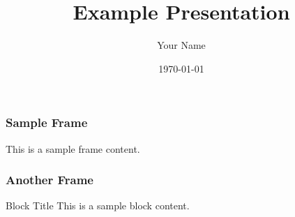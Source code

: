 \documentclass{beamer}
\begin{document}
\begin{frame}
    \title{Example Presentation}
    \author{Your Name}
    \date{\today}
    \maketitle
\end{frame}

\begin{frame}
    \frametitle{Sample Frame}
    This is a sample frame content.
\end{frame}

\begin{frame}
    \frametitle{Another Frame}
    \begin{block}{Block Title}
        This is a sample block content.
    \end{block}
\end{frame}
\end{document}
